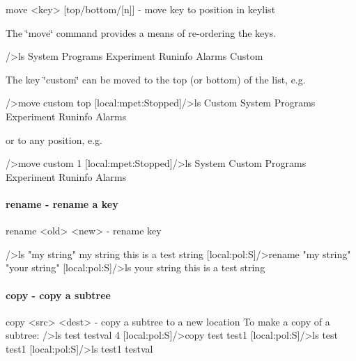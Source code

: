 \begin{DoxyCode}
move <key> [top/bottom/[n]] - move key to position in keylist
\end{DoxyCode}


The \char`\"{}move\char`\"{} command provides a means of re-\/ordering the keys. 
\begin{DoxyCode}
/>ls
System
Programs
Experiment
Runinfo
Alarms
Custom
\end{DoxyCode}


The key \char`\"{}custom\char`\"{} can be moved to the top (or bottom) of the list, e.g. 
\begin{DoxyCode}
/>move custom top
[local:mpet:Stopped]/>ls
Custom
System
Programs
Experiment
Runinfo
Alarms
\end{DoxyCode}


or to any position, e.g. 
\begin{DoxyCode}
/>move custom 1
[local:mpet:Stopped]/>ls
System
Custom
Programs
Experiment
Runinfo
Alarms
\end{DoxyCode}




\hypertarget{RC_odbedit_examples_RC_odbedit_rename}{}\paragraph{rename -\/ rename a key}\label{RC_odbedit_examples_RC_odbedit_rename}

\begin{DoxyCode}
rename <old> <new>      - rename key
\end{DoxyCode}
 \par
 
\begin{DoxyCode}
/>ls "my string"
my string                       this is a test string
[local:pol:S]/>rename "my string" "your string"
[local:pol:S]/>ls
your string                       this is a test string
\end{DoxyCode}




\hypertarget{RC_odbedit_examples_RC_odbedit_copy}{}\paragraph{copy -\/ copy a subtree}\label{RC_odbedit_examples_RC_odbedit_copy}

\begin{DoxyCode}
copy <src> <dest>       - copy a subtree to a new location
\code
To make a copy of a subtree:
/>ls test
testval                         4
[local:pol:S]/>copy test test1
[local:pol:S]/>ls
test
test1
[local:pol:S]/>ls test1
testval       
\end{DoxyCode}




